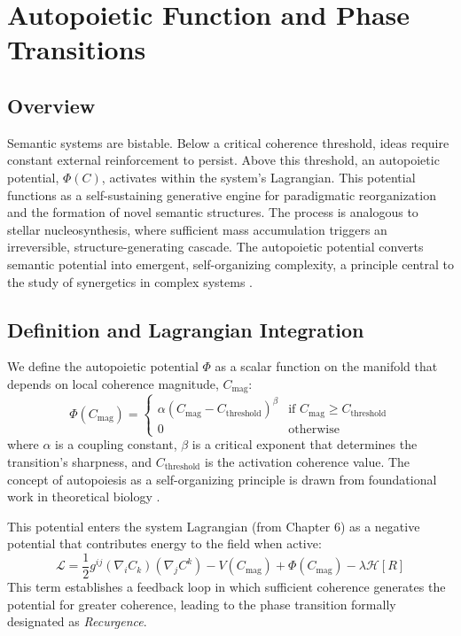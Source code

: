 \chapter{Autopoietic Function and Phase Transitions}

\section{Overview}

Semantic systems are bistable. Below a critical coherence threshold, ideas require constant external reinforcement to persist. Above this threshold, an autopoietic potential, \(\Phi(C)\), activates within the system's Lagrangian. This potential functions as a self-sustaining generative engine for paradigmatic reorganization and the formation of novel semantic structures. The process is analogous to stellar nucleosynthesis, where sufficient mass accumulation triggers an irreversible, structure-generating cascade. The autopoietic potential converts semantic potential into emergent, self-organizing complexity, a principle central to the study of synergetics in complex systems \autocite{Haken1983}.

\section{Definition and Lagrangian Integration}

We define the autopoietic potential \(\Phi\) as a scalar function on the manifold that depends on local coherence magnitude, \(C_{\mathrm{mag}}\):
\begin{equation}
\Phi(C_{\mathrm{mag}}) =
\begin{cases}
\alpha (C_{\mathrm{mag}} - C_{\text{threshold}})^{\beta} & \text{if } C_{\mathrm{mag}} \geq C_{\text{threshold}} \\
0 & \text{otherwise}
\end{cases}
\end{equation}
where \(\alpha\) is a coupling constant, \(\beta\) is a critical exponent that determines the transition's sharpness, and \(C_{\text{threshold}}\) is the activation coherence value. The concept of autopoiesis as a self-organizing principle is drawn from foundational work in theoretical biology \autocite{MaturanaVarela1980}.

This potential enters the system Lagrangian (from Chapter 6) as a negative potential that contributes energy to the field when active:
\begin{equation}
\mathcal{L} = \frac{1}{2} g^{ij} (\nabla_i C_k)(\nabla_j C^k) - V(C_{\mathrm{mag}}) + \Phi(C_{\mathrm{mag}}) - \lambda \mathcal{H}[R]
\end{equation}
This term establishes a feedback loop in which sufficient coherence generates the potential for greater coherence, leading to the phase transition formally designated as \textit{Recurgence}.

